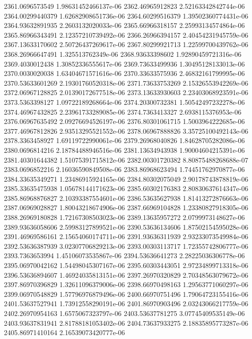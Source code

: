 {2361.0696573549 1.98631452466137e-06
2362.46965912823 2.52163342842744e-06
2364.00299440379 1.62682908651736e-06
2364.60299516379 1.39502360774431e-06
2364.93632891935 2.2603132020033e-06
2365.66966318157 2.25993134574864e-06
2365.86966343491 2.12357210739492e-06
2366.26966394157 2.40454231945759e-06
2367.13633170602 2.50726437269617e-06
2367.80299921713 1.22599700439762e-06
2368.26966647491 1.325513762349e-06
2368.93633398602 1.92890459721316e-06
2369.4030012438 1.30852336555617e-06
2369.73633499936 1.30495128133013e-06
2370.0030020038 1.63404671571616e-06
2370.33633575936 2.46832161799995e-06
2370.53633601269 2.19301760520318e-06
2371.73633753269 2.15326553942269e-06
2372.06967128825 2.01390172677518e-06
2373.13633930603 2.23403068923591e-06
2373.5363398127 1.09722189268664e-06
2374.20300732381 1.50542497232278e-06
2374.46967432825 2.23961733289085e-06
2374.7363413327 2.6938115376953e-06
2376.06967635492 2.09276694526197e-06
2376.80301061715 1.5003964222685e-06
2377.46967812826 2.93513295521552e-06
2378.06967888826 3.35725100492143e-06
2378.3363458927 1.69119722990061e-06
2379.26968040826 1.84628705282086e-06
2380.0696814216 2.18784488946516e-06
2381.13634943938 1.90004604215391e-06
2381.40301644382 1.51075391715812e-06
2382.00301720382 8.80875488268688e-07
2383.0696852216 2.16036590849508e-06
2383.86968623494 1.74451762970877e-06
2384.33635349271 1.23486915924165e-06
2384.80302075049 2.90178743878819e-06
2385.33635475938 1.05678144171623e-06
2385.60302176383 2.80830637614347e-06
2385.86968876827 2.10393387554601e-06
2386.53635627938 1.81413272876663e-06
2387.06969028827 1.80043218674906e-06
2387.66969104828 1.23380827918305e-06
2388.26969180828 1.72167308503023e-06
2389.13635957272 2.0799973148627e-06
2389.93636058606 2.59983127899521e-06
2390.53636134606 1.87502154595028e-06
2391.46969586161 2.15654060174711e-06
2391.93636311939 2.93233073549984e-06
2392.53636387939 3.02307706829213e-06
2393.00303113717 1.72355742806777e-06
2393.7363653994 1.45106073535867e-06
2394.53636641273 2.28225036306778e-06
2395.06970042162 1.54498045307167e-06
2395.60303443051 2.97234899713318e-06
2396.53636894607 1.46924035813151e-06
2397.26970320829 2.70348563079672e-06
2397.86970396829 1.32611096379006e-06
2398.66970498163 1.29563771060297e-06
2399.06970548829 1.57796976879496e-06
2400.66970751496 1.79064723155416e-06
2401.53637527941 1.73912558290191e-06
2401.86970903496 2.03243066217759e-06
2402.26970954163 1.6575067323797e-06
2403.53637781275 3.07745409535149e-06
2403.93637831941 2.81788181053402e-06
2404.73637933275 2.18835895773287e-06
2405.86971410164 2.16539073420777e-06
}

